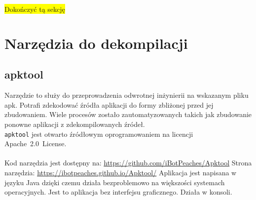 \documentclass[12pt,a4paper,leqno,oneside,titlepage]{book}
\newcommand{\todo}[1]{\colorbox{yellow}{#1}}
\begin{document}
\todo{Dokończyć tą sekcję}

\chapter{Narzędzia do dekompilacji}

\section{apktool}

Narzędzie to służy do przeprowadzenia odwrotnej inżynierii na wskazanym pliku apk. Potrafi zdekodować źródła aplikacji do formy zbliżonej przed jej zbudowaniem. Wiele procesów zostało zautomatyzowanych takich jak zbudowanie ponowne aplikacji z zdekompilowanych źródeł. \\
\lstinline|apktool| jest otwarto źródłowym oprogramowaniem na licencji \mbox{Apache 2.0 License.} \\
\\
Kod narzędzia jest dostępny na: \url{https://github.com/iBotPeaches/Apktool} \newline
Strona narzędzia: \url{https://ibotpeaches.github.io/Apktool/}
\newline
\newline
Aplikacja jest napisana w języku Java dzięki czemu działa bezproblemowo na większości systemach operacyjnych. Jest to aplikacja bez interfejsu graficznego. Działa w konsoli.
\newline
\end{document}
